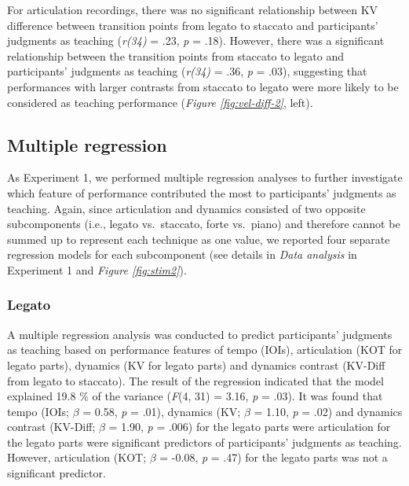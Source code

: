 \documentclass[
  man,floatsintext]{apa6}
\begin{document}
For articulation recordings, there was no significant relationship between KV difference between transition points from legato to staccato and participants' judgments as teaching (\emph{r(34)} = .23, \emph{p} = .18). However, there was a significant relationship between the transition points from staccato to legato and participants' judgments as teaching (\emph{r(34)} = .36, \emph{p} = .03), suggesting that performances with larger contrasts from staccato to legato were more likely to be considered as teaching performance (\emph{Figure \ref{fig:vel-diff-2}}, left).

\hypertarget{multiple-regression-1}{%
\subsection{Multiple regression}\label{multiple-regression-1}}

As Experiment 1, we performed multiple regression analyses to further investigate which feature of performance contributed the most to participants' judgments as teaching. Again, since articulation and dynamics consisted of two opposite subcomponents (i.e., legato vs.~staccato, forte vs.~piano) and therefore cannot be summed up to represent each technique as one value, we reported four separate regression models for each subcomponent (see details in \emph{Data analysis} in Experiment 1 and \emph{Figure \ref{fig:stim2}}).

\hypertarget{legato-1}{%
\subsubsection{Legato}\label{legato-1}}

A multiple regression analysis was conducted to predict participants' judgments as teaching based on performance features of tempo (IOIs), articulation (KOT for legato parts), dynamics (KV for legato parts) and dynamics contrast (KV-Diff from legato to staccato). The result of the regression indicated that the model explained 19.8 \% of the variance (\emph{F}(4, 31) = 3.16, \emph{p} = .03). It was found that tempo (IOIs; \emph{\(\beta\)} = 0.58, \emph{p} = .01), dynamics (KV; \emph{\(\beta\)} = 1.10, \emph{p} = .02) and dynamics contrast (KV-Diff; \emph{\(\beta\)} = 1.90, \emph{p} = .006) for the legato parts were articulation for the legato parts were significant predictors of participants' judgments as teaching. However, articulation (KOT; \emph{\(\beta\)} = -0.08, \emph{p} = .47) for the legato parts was not a significant predictor.
\end{document}

